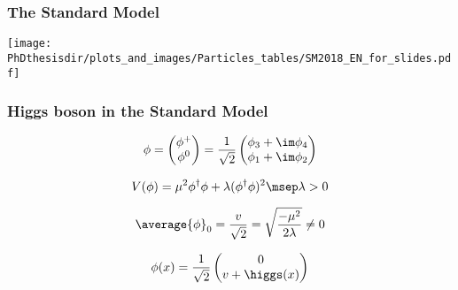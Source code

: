 \begin{frame}
\frametitle{The Standard Model}
\begin{center}
\vspace{-5pt}
\texttt{[image: \\PhDthesisdir/plots\_and\_images/Particles\_tables/SM2018\_EN\_for\_slides.pdf]}
\vspace{-5pt}
\end{center}
\end{frame}

\begin{frame}
\frametitle{Higgs boson in the Standard Model}

\begin{minipage}[c]{.45\textwidth}
\begin{equation*}
\phi
=
\begin{pmatrix}
\phi^+ \\ \phi^0
\end{pmatrix}
=
\frac{1}{\sqrt{2}}
\begin{pmatrix}
\phi_3 + \im \phi_4 \\ \phi_1 + \im \phi_2
\end{pmatrix}
\end{equation*}

\begin{equation*}
V(\phi)
= \mu^2\phi^\dagger\phi + \lambda (\phi^\dagger\phi)^2
\msep \lambda > 0
\end{equation*}

\begin{equation*}
\average{\phi}_0 = \frac{v}{\sqrt{2}} = \sqrt{\frac{-\mu^2}{2\lambda}} \neq 0
\end{equation*}

\begin{equation*}
\phi(x)
=
\frac{1}{\sqrt{2}}
\begin{pmatrix}
0 \\ v + \higgs(x)
\end{pmatrix}
\end{equation*}

\end{minipage}
\begin{minipage}[c]{.5\textwidth}
\vspace{-20pt}

\vspace{-20pt}
\end{minipage}

\end{frame}